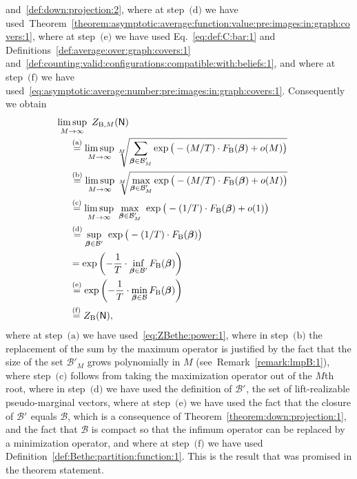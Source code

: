 \documentclass[journal, twocolumn]{IEEEtran}
\newcommand{\graph}[1]{\mathsf{#1}}
\newcommand{\onestareq}{\overset{\text{(a)}}{=}}
\newcommand{\twostarseq}{\overset{\text{(b)}}{=}}
\newcommand{\threestarseq}{\overset{\text{(c)}}{=}}
\newcommand{\fourstarseq}{\overset{\text{(d)}}{=}}
\newcommand{\fivestarseq}{\overset{\text{(e)}}{=}}
\newcommand{\sixstarseq}{\overset{\text{(f)}}{=}}
\newcommand{\onestar}{\text{(a)}}
\newcommand{\twostars}{\text{(b)}}
\newcommand{\threestars}{\text{(c)}}
\newcommand{\fourstars}{\text{(d)}}
\newcommand{\fivestars}{\text{(e)}}
\newcommand{\sixstars}{\text{(f)}}
\newcommand{\bel}{\beta}
\newcommand{\vbel}{\boldsymbol{\bel}}
\newcommand{\lmpB}{\mathcal{B}}
\newcommand{\lmpBdown}[1]{\mathcal{B}'_{#1}}
\newcommand{\graphN}{\graph{N}}
\newcommand{\FBethe}{F_{\mathrm{B}}}
\newcommand{\ZBethe}{Z_{\mathrm{B}}}
\newcommand{\ZBetheM}[1]{Z_{\mathrm{B}, #1}}
\newcommand{\?}{\mathrm{?}}
\begin{document}
and~\ref{def:down:projection:2}, where at step~$\fourstars$ we have
used~Theorem~\ref{theorem:asymptotic:average:function:value:pre:images:in:graph:covers:1},
where at step~$\fivestars$ we have used Eq.~\eqref{eq:def:C:bar:1} and
Definitions~\ref{def:average:over:graph:covers:1}
and~\ref{def:counting:valid:configurations:compatible:with:beliefs:1}, and
where at step~$\sixstars$ we have
used~\eqref{eq:asymptotic:average:number:pre:images:in:graph:covers:1}.
Consequently we obtain
\begin{align*}
  &
  \hskip-0.5cm
  \limsup_{M \to \infty} \
    \ZBetheM{M}(\graphN) \\
    &\onestareq
       \limsup_{M \to \infty}
         \sqrt[M]{\sum_{\vbel \in \lmpBdown{M}}
                    \exp
                      \big(
                        - (M/T) \cdot \FBethe(\vbel) + o(M)
                      \big)
                 } \\
    &\twostarseq
       \limsup_{M \to \infty}
         \sqrt[M]{\max_{\vbel \in \lmpBdown{M}} 
                   \exp\big( - (M/T) \cdot \FBethe(\vbel) + o(M) \big)
                 } \\
    &\threestarseq
       \limsup_{M \to \infty} \ 
         \max_{\vbel \in \lmpBdown{M}} \ 
           \exp\big( - (1/T) \cdot \FBethe(\vbel) + o(1) \big) \\
    &\fourstarseq
       \sup_{\vbel \in \lmpBdown{}} \ 
       \exp
         \big(
           -
           (1/T)
           \cdot
           \FBethe(\vbel)
         \big) \\
    &= \exp
         \left(
           -
           \frac{1}{T}
           \cdot
           \inf_{\vbel \in \lmpBdown{}}
             \FBethe(\vbel)
         \right) \\
    &\fivestarseq
       \exp
         \left(
           -
           \frac{1}{T}
           \cdot
           \min_{\vbel \in \lmpB}
             \FBethe(\vbel)
         \right) \\
    &\sixstarseq
       \ZBethe(\graphN),
\end{align*}
where at step~$\onestar$ we have used~\eqref{eq:ZBethe:power:1}, where in
step~$\twostars$ the replacement of the sum by the maximum operator is
justified by the fact that the size of the set $\lmpBdown{M}$ grows polynomially
in $M$ (see~Remark~\ref{remark:lmpB:1}), where step~$\threestars$ follows from
taking the maximization operator out of the $M$th root, where in
step~$\fourstars$ we have used the definition of $\lmpBdown{}$, the set of
lift-realizable pseudo-marginal vectors, where at step~$\fivestars$ we have
used the fact that the closure of $\lmpBdown{}$ equals $\lmpB$, which is a
consequence of Theorem~\ref{theorem:down:projection:1}, and the fact that
$\lmpB$ is compact so that the infimum operator can be replaced by a
minimization operator, and where at step~$\sixstars$ we have used
Definition~\ref{def:Bethe:partition:function:1}. This is the result that was
promised in the theorem statement.
\end{document}
